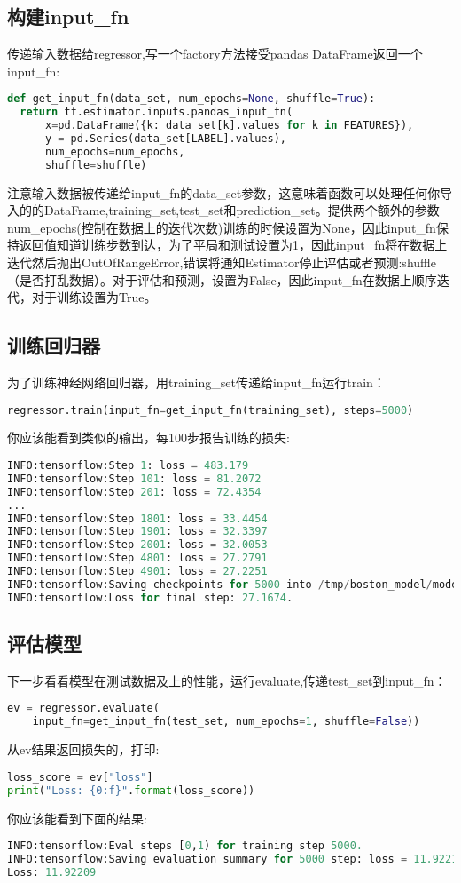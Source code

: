 \subsection{构建input\_fn}
传递输入数据给regressor,写一个factory方法接受pandas DataFrame返回一个input\_fn:
\begin{lstlisting}[language=Python]
def get_input_fn(data_set, num_epochs=None, shuffle=True):
  return tf.estimator.inputs.pandas_input_fn(
      x=pd.DataFrame({k: data_set[k].values for k in FEATURES}),
      y = pd.Series(data_set[LABEL].values),
      num_epochs=num_epochs,
      shuffle=shuffle)
\end{lstlisting}
注意输入数据被传递给input\_fn的data\_set参数，这意味着函数可以处理任何你导入的的DataFrame,training\_set,test\_set和prediction\_set。提供两个额外的参数num\_epochs(控制在数据上的迭代次数)训练的时候设置为None，因此input\_fn保持返回值知道训练步数到达，为了平局和测试设置为1，因此input\_fn将在数据上迭代然后抛出OutOfRangeError,错误将通知Estimator停止评估或者预测:shuffle（是否打乱数据）。对于评估和预测，设置为False，因此input\_fn在数据上顺序迭代，对于训练设置为True。
\subsection{训练回归器}
为了训练神经网络回归器，用training\_set传递给input\_fn运行train：
\begin{lstlisting}[language=Python]
regressor.train(input_fn=get_input_fn(training_set), steps=5000)
\end{lstlisting}
你应该能看到类似的输出，每100步报告训练的损失:
\begin{lstlisting}[language=Python]
INFO:tensorflow:Step 1: loss = 483.179
INFO:tensorflow:Step 101: loss = 81.2072
INFO:tensorflow:Step 201: loss = 72.4354
...
INFO:tensorflow:Step 1801: loss = 33.4454
INFO:tensorflow:Step 1901: loss = 32.3397
INFO:tensorflow:Step 2001: loss = 32.0053
INFO:tensorflow:Step 4801: loss = 27.2791
INFO:tensorflow:Step 4901: loss = 27.2251
INFO:tensorflow:Saving checkpoints for 5000 into /tmp/boston_model/model.ckpt.
INFO:tensorflow:Loss for final step: 27.1674.
\end{lstlisting}
\subsection{评估模型}
下一步看看模型在测试数据及上的性能，运行evaluate,传递test\_set到input\_fn：
\begin{lstlisting}[language=Python]
ev = regressor.evaluate(
    input_fn=get_input_fn(test_set, num_epochs=1, shuffle=False))
\end{lstlisting}
从ev结果返回损失的，打印:
\begin{lstlisting}[language=Python]
loss_score = ev["loss"]
print("Loss: {0:f}".format(loss_score))
\end{lstlisting}
你应该能看到下面的结果:
\begin{lstlisting}[language=Python]
INFO:tensorflow:Eval steps [0,1) for training step 5000.
INFO:tensorflow:Saving evaluation summary for 5000 step: loss = 11.9221
Loss: 11.92209
\end{lstlisting}
